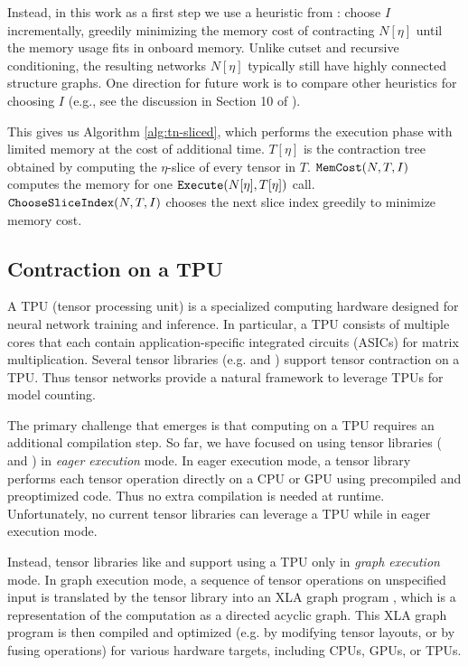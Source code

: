 Instead, in this work as a first step we use a heuristic from \cite{CZHNS18,GK20}: choose $I$ incrementally, greedily minimizing the memory cost of contracting $N[\eta]$ until the memory usage fits in onboard memory. Unlike cutset and recursive conditioning, the resulting networks $N[\eta]$ typically still have highly connected structure graphs. One direction for future work is to compare other heuristics for choosing $I$ (e.g., see the discussion in Section 10 of \cite{dechter99}).

This gives us Algorithm \ref{alg:tn-sliced}, which performs the execution phase with limited memory at the cost of additional time. $T[\eta]$ is the contraction tree obtained by computing the $\eta$-slice of every tensor in $T$. $\texttt{\upshape MemCost}(N, T, I)$ computes the memory for one $\texttt{\upshape Execute}(N[\eta], T[\eta])$ call. $\texttt{\upshape ChooseSliceIndex}(N,T,I)$ chooses the next slice index greedily to minimize memory cost.

\subsection{Contraction on a TPU}
\label{sec:parallel:execution:tpu}
A TPU (tensor processing unit) \cite{JYPPABBBBB17} is a specialized computing hardware designed for neural network training and inference.
In particular, a TPU consists of multiple cores that each contain application-specific integrated circuits (ASICs) for matrix multiplication.
Several tensor libraries (e.g.  \cite{ABCCDDDGII16} and  \cite{jax2018github}) support tensor contraction on a TPU.
Thus tensor networks provide a natural framework to leverage TPUs for model counting.

The primary challenge that emerges is that computing on a TPU requires an additional compilation step.
So far, we have focused on using tensor libraries ( \cite{numpy} and  \cite{ABCCDDDGII16}) in \emph{eager execution} mode.
In eager execution mode, a tensor library performs each tensor operation directly on a CPU or GPU using precompiled and preoptimized code.
Thus no extra compilation is needed at runtime.
Unfortunately, no current tensor libraries can leverage a TPU while in eager execution mode.

Instead, tensor libraries like  \cite{ABCCDDDGII16} and  \cite{jax2018github} support using a TPU only in \emph{graph execution} mode. 
In graph execution mode, a sequence of tensor operations on unspecified input is translated by the tensor library into an XLA graph program \cite{XLA}, which is a representation of the computation as a directed acyclic graph. 
This XLA graph program is then compiled and optimized (e.g. by modifying tensor layouts, or by fusing operations) for various hardware targets, including CPUs, GPUs, or TPUs. 

